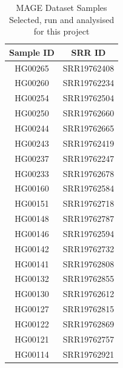 \documentclass{article}
\begin{document}
\begin{table}[H]
  \centering
  \renewcommand{\arraystretch}{1.3} %
  \setlength{\tabcolsep}{10pt} %
  \begin{tabular}{|c|c|}
      \hline
      \textbf{Sample ID} & \textbf{SRR ID} \\ \hline
      HG00265 & SRR19762408 \\ 
      HG00260 & SRR19762234 \\ 
      HG00254 & SRR19762504 \\ 
      HG00250 & SRR19762660 \\ 
      HG00244 & SRR19762665 \\ 
      HG00243 & SRR19762419 \\ 
      HG00237 & SRR19762247 \\ 
      HG00233 & SRR19762678 \\ 
      HG00160 & SRR19762584 \\ 
      HG00151 & SRR19762718 \\ 
      HG00148 & SRR19762787 \\ 
      HG00146 & SRR19762594 \\ 
      HG00142 & SRR19762732 \\ 
      HG00141 & SRR19762808 \\ 
      HG00132 & SRR19762855 \\ 
      HG00130 & SRR19762612 \\ 
      HG00127 & SRR19762815 \\ 
      HG00122 & SRR19762869 \\ 
      HG00121 & SRR19762757 \\ 
      HG00114 & SRR19762921 \\ \hline
  \end{tabular}
  \vspace{0.25cm}
  \caption{MAGE Dataset Samples Selected, run and analysised for this project}
  \label{tab:sample_data}
\end{table}




\end{document}
